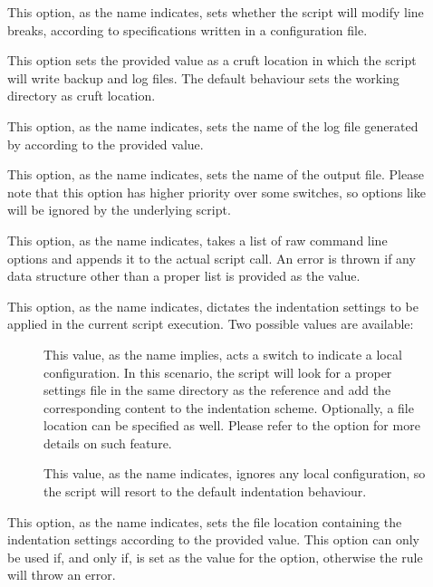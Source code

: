 \begin{description}
\begin{description}
\item[] This option, as the name indicates, sets whether the script will modify line breaks, according to specifications written in a configuration file.

\item[] This option sets the provided value as a cruft location in which the script will write backup and log files. The default behaviour sets the working directory as cruft location.

\item[] This option, as the name indicates, sets the name of the log file generated by  according to the provided value.

\item[] This option, as the name indicates, sets the name of the output file. Please note that this option has higher priority over some switches, so options like  will be ignored by the underlying script.

\item[] This option, as the name indicates, takes a list of raw command line options and appends it to the actual script call. An error is thrown if any data structure other than a proper list is provided as the value.

\item[] This option, as the name indicates, dictates the indentation settings to be applied in the current script execution. Two possible values are available:

\begin{description}
\item[] This value, as the name implies, acts a switch to indicate a local configuration. In this scenario, the script will look for a proper settings file in the same directory as the  reference and add the corresponding content to the indentation scheme. Optionally, a file location can be specified as well. Please refer to the  option for more details on such feature.

\item[] This value, as the name indicates, ignores any local configuration, so the script will resort to the default indentation behaviour.
\end{description}

\item[] This option, as the name indicates, sets the file location containing the indentation settings according to the provided value. This option can only be used if, and only if,  is set as the value for the  option, otherwise the rule will throw an error.


\end{description}
\end{description}
